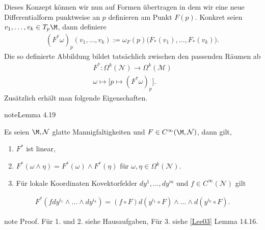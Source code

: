 \documentclass[letterpaper,10pt,english]{jupyterBook}
\begin{document}
\sphinxAtStartPar
Dieses Konzept können wir nun auf Formen übertragen in dem wir eine neue Differentialform punktweise an \(p\) definieren am Punkt \(F(p)\). Konkret seien \(v_1,\ldots, v_k\in T_p\M\), dann definiere
\begin{equation*}
\begin{split}(F^\ast\omega)_p (v_1,\ldots,v_k) := \omega_F(p)\big(F_\ast(v_1),\ldots,F_\ast(v_k)\big).\end{split}
\end{equation*}
\sphinxAtStartPar
Die so definierte Abbildung bildet tatsächlich zwischen den passenden Räumen ab
\begin{equation*}
\begin{split}F^\ast:\Omega^k(\mathcal{N})\to\Omega^k(\mathcal{M})\\
\omega\mapsto \big[ p\mapsto (F^\ast\omega)_p \big].\end{split}
\end{equation*}
\sphinxAtStartPar
Zusätzlich erhält man folgende Eigenschaften.
\label{manifolds/diffformen:lem:pullbackprop}
\begin{sphinxadmonition}{note}{Lemma 4.19}



\sphinxAtStartPar
Es seien \(\M,\mathcal{N}\) glatte Mannigfaltigkeiten und \(F\in C^\infty(\M,\mathcal{N})\), dann gilt,
\begin{enumerate}
%
\item {} 
\sphinxAtStartPar
\(F^\ast\) ist linear,

\item {} 
\sphinxAtStartPar
\(F^\ast(\omega\wedge\eta) = F^\ast(\omega) \wedge F^\ast(\eta)\) für \(\omega,\eta\in\Omega^k(\mathcal{N})\).

\item {} 
\sphinxAtStartPar
Für lokale Koordinaten Kovektorfelder \(dy^1,\ldots,dy^m\) und \(f\in C^\infty(\mathcal{N})\) gilt

\end{enumerate}
\begin{equation*}
\begin{split}F^\ast(f dy^{i_1}\wedge\ldots\wedge dy^{i_k}) = (f \circ F) d(y^{i_1}\circ F)\wedge\ldots\wedge d(y^{i_k}\circ F).\end{split}
\end{equation*}\end{sphinxadmonition}

\begin{sphinxadmonition}{note}
\sphinxAtStartPar
Proof. Für 1. und 2. siehe Hausaufgaben, Für 3. siehe {[}\hyperlink{cite.references:id15}{Lee03}{]} Lemma 14.16.
\end{sphinxadmonition}
\end{document}
